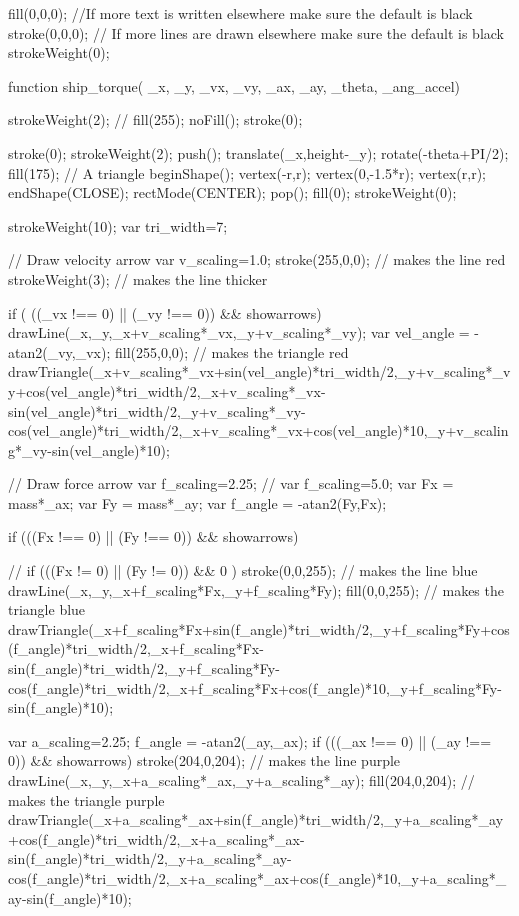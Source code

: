 \documentclass{ximera}
\begin{document}
\begin{javascriptCode}
{    fill(0,0,0); //If more text is written elsewhere make sure the default is black
    stroke(0,0,0); // If more lines are drawn elsewhere make sure the default is black
    strokeWeight(0);

}

function ship_torque( _x,  _y, _vx, _vy, _ax, _ay, _theta, _ang_accel)
{
    strokeWeight(2);
    //    fill(255);
    noFill();
    stroke(0);

    stroke(0);
    strokeWeight(2);
    push();
    translate(_x,height-_y);
    rotate(-theta+PI/2);
    fill(175);
    // A triangle
    beginShape();
    vertex(-r,r);
    vertex(0,-1.5*r);
    vertex(r,r);
    endShape(CLOSE);
    rectMode(CENTER);
    pop();
    fill(0);
    strokeWeight(0);
  
  
  
    strokeWeight(10);
    var tri_width=7;

    // Draw velocity arrow
    var v_scaling=1.0;
    stroke(255,0,0); // makes the line red
    strokeWeight(3); // makes the line thicker

    if ( ((_vx !== 0) || (_vy !== 0)) && showarrows) {
        drawLine(_x,_y,_x+v_scaling*_vx,_y+v_scaling*_vy);
        var vel_angle = -atan2(_vy,_vx);
        fill(255,0,0); // makes the triangle red
        drawTriangle(_x+v_scaling*_vx+sin(vel_angle)*tri_width/2,_y+v_scaling*_vy+cos(vel_angle)*tri_width/2,_x+v_scaling*_vx-sin(vel_angle)*tri_width/2,_y+v_scaling*_vy-cos(vel_angle)*tri_width/2,_x+v_scaling*_vx+cos(vel_angle)*10,_y+v_scaling*_vy-sin(vel_angle)*10);
    }

     // Draw force arrow
    var f_scaling=2.25;
//    var f_scaling=5.0;
    var Fx = mass*_ax;
    var Fy = mass*_ay;
    var f_angle = -atan2(Fy,Fx);

    if (((Fx !== 0) || (Fy !== 0)) && showarrows) {
//    if (((Fx != 0) || (Fy != 0)) && 0 ) {
    stroke(0,0,255); // makes the line blue
    drawLine(_x,_y,_x+f_scaling*Fx,_y+f_scaling*Fy);
    fill(0,0,255); // makes the triangle blue
    drawTriangle(_x+f_scaling*Fx+sin(f_angle)*tri_width/2,_y+f_scaling*Fy+cos(f_angle)*tri_width/2,_x+f_scaling*Fx-sin(f_angle)*tri_width/2,_y+f_scaling*Fy-cos(f_angle)*tri_width/2,_x+f_scaling*Fx+cos(f_angle)*10,_y+f_scaling*Fy-sin(f_angle)*10);    
    }
  
    var a_scaling=2.25;
    f_angle = -atan2(_ay,_ax);
    if (((_ax !== 0) || (_ay !== 0)) && showarrows) {
    stroke(204,0,204); // makes the line purple
    drawLine(_x,_y,_x+a_scaling*_ax,_y+a_scaling*_ay);
    fill(204,0,204); // makes the triangle purple
    drawTriangle(_x+a_scaling*_ax+sin(f_angle)*tri_width/2,_y+a_scaling*_ay+cos(f_angle)*tri_width/2,_x+a_scaling*_ax-sin(f_angle)*tri_width/2,_y+a_scaling*_ay-cos(f_angle)*tri_width/2,_x+a_scaling*_ax+cos(f_angle)*10,_y+a_scaling*_ay-sin(f_angle)*10);
    }

}}
\end{javascriptCode}
\end{document}
